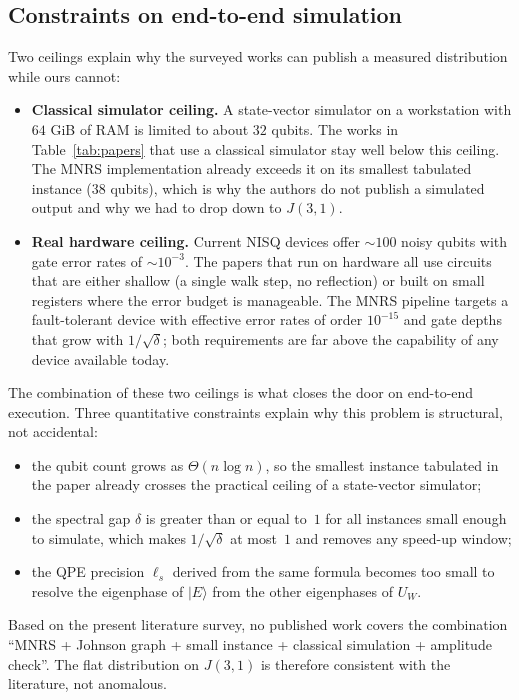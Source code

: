 \documentclass[11pt,a4paper]{article}
\begin{document}
\subsection{Constraints on end-to-end simulation}

Two ceilings explain why the surveyed works can publish a
measured distribution while ours cannot:
\begin{itemize}[leftmargin=1.2em]
\item \textbf{Classical simulator ceiling.} A state-vector
simulator on a workstation with $64$ GiB of RAM is limited to
about $32$ qubits. The works in Table~\ref{tab:papers} that use
a classical simulator stay well below this ceiling. The MNRS
implementation already exceeds it on its smallest tabulated
instance ($38$ qubits), which is why the authors do not publish
a simulated output and why we had to drop down to $J(3,1)$.
\item \textbf{Real hardware ceiling.} Current NISQ devices offer
$\sim 100$ noisy qubits with gate error rates of $\sim 10^{-3}$.
The papers that run on hardware all use circuits that are either
shallow (a single walk step, no reflection) or built on small
registers where the error budget is manageable. The MNRS pipeline
targets a fault-tolerant device with effective error rates of
order $10^{-15}$ and gate depths that grow with $1/\sqrt{\delta}$;
both requirements are far above the capability of any device
available today.
\end{itemize}
The combination of these two ceilings is what closes the door on
end-to-end execution. Three quantitative constraints explain why
this problem is structural, not accidental:
\begin{itemize}[leftmargin=1.2em]
\item the qubit count grows as $\Theta(n \log n)$, so the
smallest instance tabulated in the paper already crosses the
practical ceiling of a state-vector simulator;
\item the spectral gap $\delta$ is greater than or equal to~$1$ for all
instances small enough to simulate, which makes $1/\sqrt{\delta}$
at most~$1$ and removes any speed-up window;
\item the QPE precision $\ell_s$ derived from the same formula
becomes too small to resolve the eigenphase of $|E\rangle$ from
the other eigenphases of $U_W$.
\end{itemize}
Based on the present literature survey, no published work
covers the combination ``MNRS + Johnson graph + small instance +
classical simulation + amplitude check''. The flat distribution
on $J(3,1)$ is therefore consistent with the literature, not
anomalous.
\end{document}
